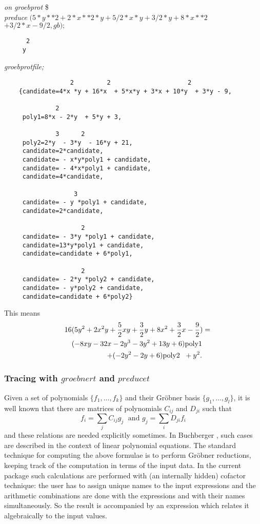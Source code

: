 \newpage

\example {}

{\it on groebprot} \$ \\
{\it preduce} $ (5*y**2 + 2*x**2*y + 5/2*x*y + 3/2*y + 8*x**2 $ \\
\hspace*{+1cm} $+ 3/2*x - 9/2, gb);$
\begin{verbatim}
      2
     y
\end{verbatim}
{\it groebprotfile;}
\begin{verbatim}
                  2         2                     2
    {candidate=4*x *y + 16*x  + 5*x*y + 3*x + 10*y  + 3*y - 9,

              2
     poly1=8*x - 2*y  + 5*y + 3,

              3      2
     poly2=2*y  - 3*y  - 16*y + 21,
     candidate=2*candidate,
     candidate= - x*y*poly1 + candidate,
     candidate= - 4*x*poly1 + candidate,
     candidate=4*candidate,

                   3
     candidate= - y *poly1 + candidate,
     candidate=2*candidate,

                     2
     candidate= - 3*y *poly1 + candidate,
     candidate=13*y*poly1 + candidate,
     candidate=candidate + 6*poly1,

                     2
     candidate= - 2*y *poly2 + candidate,
     candidate= - y*poly2 + candidate,
     candidate=candidate + 6*poly2}

 \end{verbatim}
This means
\begin{eqnarray*}
\lefteqn{
16 (5 y^2 + 2 x^2 y + \frac{5}{2} x y + \frac{3}{2} y
+ 8 x^2+ \frac{3}{2} x - \frac{9}{2})=} \\ & &
(-8 x y -32 x -2 y^3 -3 y^2 + 13 y + 6) \mbox{poly1} \\
& & \; + (-2 y^2 -2 y + 6) \mbox{poly2  } \; + y^2.
\end{eqnarray*}

\subsubsection{Tracing with $groebnert$ and $preducet$}
Given a set of polynomials $\{f_1,\ldots ,f_k\}$ and their Gr\"obner
basis $\{g_1,\ldots ,g_l\}$, it is well known that there are matrices of
polynomials $C_{ij}$ and $D_{ji}$ such that
\[
f_i = \displaystyle{\sum\limits_j} C_{ij} g_j \;\mbox{  and  } g_j =
\displaystyle{\sum\limits_i} D_{ji} f_i
\]
and these relations are needed explicitly sometimes.
In {\sc Buchberger} \cite{Buchberger:85}, such cases are described in the
context of linear polynomial equations. The standard technique for
computing the above formulae is to perform
Gr\"obner reductions, keeping track of the
computation in terms of the input data. In the current package such
calculations are performed with (an internally hidden) cofactor
technique: the user has to assign unique names to the input
expressions and the  arithmetic combinations are done with the
expressions and with their names simultaneously. So the result is
accompanied by an expression which relates it algebraically to the
input values.

